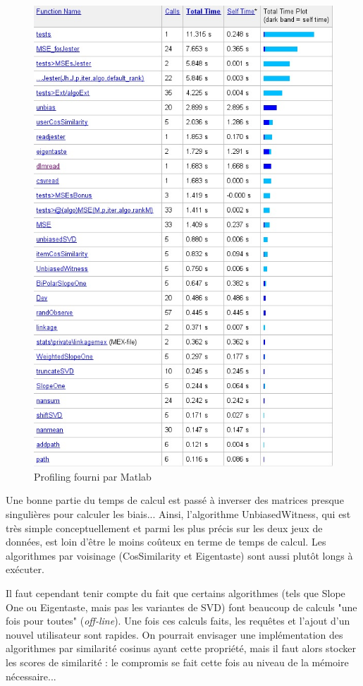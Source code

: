 \documentclass[11pt, openany, a4paper]{article}
\begin{document}
		\begin{figure}[ht!]
			\centering
			\includegraphics[width=0.9\linewidth]{times.jpg}
			\caption{Profiling fourni par Matlab}
		\end{figure}
		

		Une bonne partie du temps de calcul est passé à inverser des matrices presque singulières pour calculer les biais... Ainsi, l'algorithme UnbiasedWitness, qui est très simple conceptuellement et parmi les plus précis sur les deux jeux de données, est loin d'être le moins coûteux en terme de temps de calcul.
		Les algorithmes par voisinage (CosSimilarity et Eigentaste) sont aussi plutôt longs à exécuter.
				
		Il faut cependant tenir compte du fait que certains algorithmes (tels que Slope One ou Eigentaste, mais pas les variantes de SVD) font beaucoup de calculs "une fois pour toutes" (\emph{off-line}). Une fois ces calculs faits, les requêtes et l'ajout d'un nouvel utilisateur sont rapides. On pourrait envisager une implémentation des algorithmes par similarité cosinus ayant cette propriété, mais il faut alors stocker les scores de similarité : le compromis se fait cette fois au niveau de la mémoire nécessaire...
		


\end{document}
